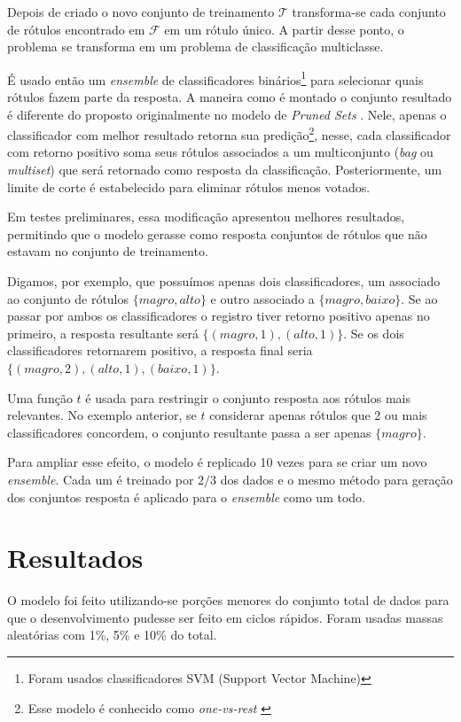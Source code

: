 \documentclass[runningheads,a4paper]{llncs}
\begin{document}
Depois de criado o novo conjunto de treinamento $\mathcal{T}$ transforma-se cada conjunto de rótulos encontrado em $\mathcal{F}$ em um rótulo único. A partir desse ponto, o problema se transforma em um problema de classificação multiclasse.

É usado então um \textit{ensemble} de classificadores binários\footnote{Foram usados classificadores SVM (Support Vector Machine)} para selecionar quais rótulos fazem parte da resposta. A maneira como é montado o conjunto resultado é diferente do proposto originalmente no modelo de \textit{Pruned Sets} \cite{Read2008-bt}. Nele, apenas o classificador com melhor resultado retorna sua predição\footnote{Esse modelo é conhecido como \textit{one-vs-rest} \cite{Bishop2006-vm}}, nesse, cada classificador com retorno positivo soma seus rótulos associados a um multiconjunto (\textit{bag} ou \textit{multiset}) que será retornado como resposta da classificação. Posteriormente, um limite de corte é estabelecido para eliminar rótulos menos votados.

Em testes preliminares, essa modificação apresentou melhores resultados, permitindo que o modelo gerasse como resposta conjuntos de rótulos que não estavam no conjunto de treinamento.

Digamos, por exemplo, que possuímos apenas dois classificadores, um associado ao conjunto de rótulos $\{magro, alto\}$ e outro associado a $\{magro, baixo\}$. Se ao passar por ambos os classificadores o registro tiver retorno positivo apenas no primeiro, a resposta resultante será $\{(magro, 1), (alto, 1)\}$. Se os dois classificadores retornarem positivo, a resposta final seria $\{(magro, 2), (alto, 1), (baixo, 1)\}$.

Uma função $t$ é usada para restringir o conjunto resposta aos rótulos mais relevantes. No exemplo anterior, se $t$ considerar apenas rótulos que 2 ou mais classificadores concordem, o conjunto resultante passa a ser apenas $\{magro\}$.

Para ampliar esse efeito, o modelo é replicado 10 vezes para se criar um novo \textit{ensemble}. Cada um é treinado por $2/3$ dos dados e o mesmo método para geração dos conjuntos resposta é aplicado para o \textit{ensemble} como um todo.

\section{Resultados} \label{sec:resultados}

O modelo foi feito utilizando-se porções menores do conjunto total de dados para que o desenvolvimento pudesse ser feito em ciclos rápidos. Foram usadas massas aleatórias com 1\%, 5\% e 10\% do total.
\end{document}
